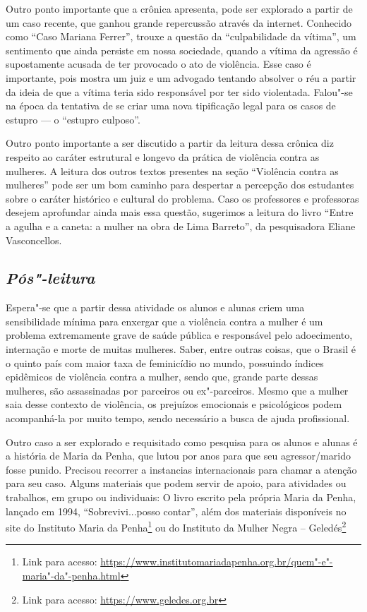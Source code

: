 \documentclass{extarticle}
\begin{document}
Outro ponto importante que a crônica apresenta, pode ser explorado a
partir de um caso recente, que ganhou grande repercussão através da
internet. Conhecido como ``Caso Mariana Ferrer'', trouxe a questão da
``culpabilidade da vítima'', um sentimento que ainda persiste em nossa
sociedade, quando a vítima da agressão é supostamente acusada de ter
provocado o ato de violência. Esse caso é importante, pois mostra um
juiz e um advogado tentando absolver o réu a partir da ideia de que a
vítima teria sido responsável por ter sido violentada. Falou"-se na época
da tentativa de se criar uma nova tipificação legal para os casos de
estupro --- o ``estupro culposo''.

Outro ponto importante a ser discutido a partir da leitura dessa crônica
diz respeito ao caráter estrutural e longevo da prática de violência
contra as mulheres. A leitura dos outros textos presentes na seção
``Violência contra as mulheres'' pode ser um bom caminho para despertar
a percepção dos estudantes sobre o caráter histórico e cultural do
problema. Caso os professores e professoras desejem aprofundar ainda
mais essa questão, sugerimos a leitura do livro ``Entre a agulha e a
caneta: a mulher na obra de Lima Barreto'', da pesquisadora Eliane
Vasconcellos.

\subsection{\textit{Pós"-leitura}}

Espera"-se que a partir dessa atividade os alunos e alunas criem uma
sensibilidade mínima para enxergar que a violência contra a mulher é um
problema extremamente grave de saúde pública e responsável pelo
adoecimento, internação e morte de muitas mulheres. Saber, entre outras
coisas, que o Brasil é o quinto país com maior taxa de feminicídio no
mundo, possuindo índices epidêmicos de violência contra a mulher, sendo
que, grande parte dessas mulheres, são assassinadas por parceiros ou
ex"-parceiros. Mesmo que a mulher saia desse contexto de violência, os
prejuízos emocionais e psicológicos podem acompanhá-la por muito tempo,
sendo necessário a busca de ajuda profissional.

Outro caso a ser explorado e requisitado como pesquisa para os alunos e
alunas é a história de Maria da Penha, que lutou por anos para que seu
agressor/marido fosse punido. Precisou recorrer a instancias
internacionais para chamar a atenção para seu caso. Alguns materiais que
podem servir de apoio, para atividades ou trabalhos, em grupo ou
individuais: O livro escrito pela própria Maria da Penha, lançado em
1994, ``Sobrevivi...posso contar'', além dos materiais disponíveis no
site do Instituto Maria da Penha\footnote{Link para acesso:
  \url{https://www.institutomariadapenha.org.br/quem"-e"-maria"-da"-penha.html}}
ou do Instituto da Mulher Negra -- Geledés\footnote{Link para acesso:
  \url{https://www.geledes.org.br}}
  
\end{document}
